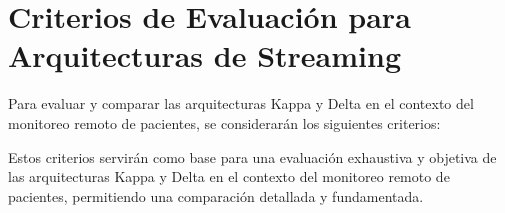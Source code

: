 \section{Criterios de Evaluación para Arquitecturas de Streaming}

Para evaluar y comparar las arquitecturas Kappa y Delta en el contexto del monitoreo remoto de pacientes, se considerarán los siguientes criterios:








Estos criterios servirán como base para una evaluación exhaustiva y objetiva de las arquitecturas Kappa y Delta en el contexto del monitoreo remoto de pacientes, permitiendo una comparación detallada y fundamentada.
\newpage